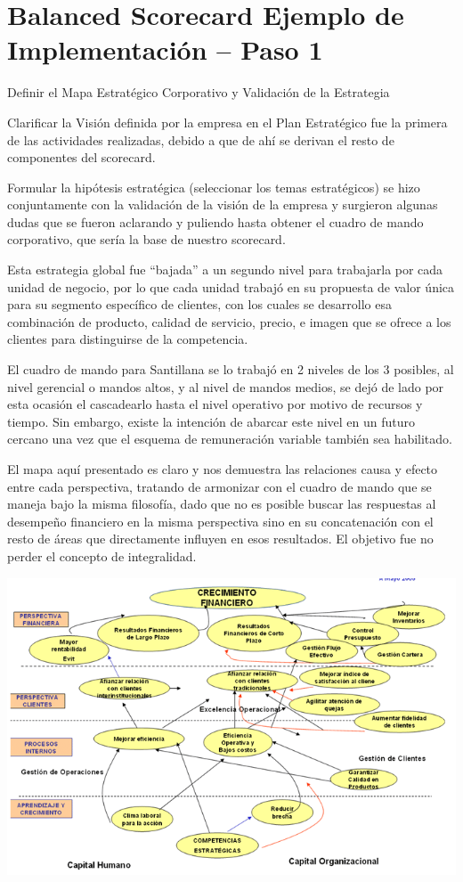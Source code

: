 \section{Balanced Scorecard Ejemplo de Implementación – Paso 1}
\item {Definir el Mapa Estratégico Corporativo y Validación de la Estrategia

Clarificar la Visión definida por la empresa en el Plan Estratégico fue la primera de las actividades realizadas, debido a que de ahí se derivan el resto de componentes del scorecard.

Formular la hipótesis estratégica (seleccionar los temas estratégicos) se hizo conjuntamente con la validación de la visión de la empresa y surgieron algunas dudas que se fueron aclarando y puliendo hasta obtener el cuadro de mando corporativo, que sería la base de nuestro scorecard.

Esta estrategia global fue “bajada” a un segundo nivel para trabajarla por cada unidad de negocio, por lo que cada unidad trabajó en su propuesta de valor única para su segmento específico de clientes, con los cuales se desarrollo esa combinación de producto, calidad de servicio, precio, e imagen que se ofrece a los clientes para distinguirse de la competencia.

El cuadro de mando para Santillana se lo trabajó en 2 niveles de los 3 posibles, al nivel gerencial o mandos altos, y al nivel de mandos medios, se dejó de lado por esta ocasión el cascadearlo hasta el nivel operativo por motivo de recursos y tiempo. Sin embargo, existe la intención de abarcar este nivel en un futuro cercano una vez que el esquema de remuneración variable también sea habilitado.

El mapa aquí presentado es claro y nos demuestra las relaciones causa y efecto entre cada perspectiva, tratando de armonizar con el cuadro de mando que se maneja bajo la misma filosofía, dado que no es posible buscar las respuestas al desempeño financiero en la misma perspectiva sino en su concatenación con el resto de áreas que directamente influyen en esos resultados. El objetivo fue no perder el concepto de integralidad.}

\begin{center}
\includegraphics[width=15cm]{./Imagenes/ImagenEmpresa3.png}
\end{center}

